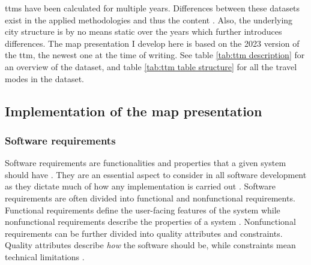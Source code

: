 
\acrshort{ttm}s have been calculated for multiple years.
Differences between these datasets exist in the applied methodologies and thus the content
\parencite{ten2020}.
Also, the underlying city structure is by no means static over the years
which further introduces differences.
The map presentation I develop here is based on the 2023 version of the \acrshort{ttm},
the newest one at the time of writing.
See table \ref{tab:ttm description} for an overview of the dataset,
and table \ref{tab:ttm table structure} for all the travel modes in the dataset.







\subsection{Implementation of the map presentation}

\subsubsection{Software requirements}


Software requirements are functionalities and properties
that a given system should have \parencite{chu2009}.
They are an essential aspect to consider in all software development
as they dictate much of how any implementation is carried out \parencite{saq2020}.
Software requirements are often divided into
functional and nonfunctional requirements.
Functional requirements define the user-facing features of the system
while nonfunctional requirements describe the properties of a system
\parencite{chu2009}.
Nonfunctional requirements can be further divided into
quality attributes and constraints.
Quality attributes describe \textit{how} the software should be,
while constraints mean technical limitations \parencite{chu2009}.

